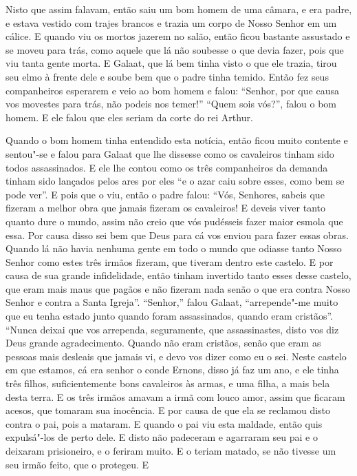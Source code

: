 Nisto que assim falavam, então saiu um bom homem de uma câmara, e era padre, e
estava vestido com trajes brancos e trazia um corpo de Nosso Senhor em um
cálice. E quando viu os mortos jazerem no salão, então ficou bastante assustado
e se moveu para trás, como aquele que lá não soubesse o que devia fazer, pois
que viu tanta gente morta. E Galaat, que lá bem tinha visto o que ele trazia,
tirou seu elmo à frente dele e soube bem que o padre tinha temido. Então fez
seus companheiros esperarem e veio ao bom homem e falou: “Senhor, por que causa
vos movestes para trás, não podeis nos temer!” “Quem sois vós?”, falou o bom
homem. E ele falou que eles seriam da corte do rei Arthur.  

Quando o bom homem tinha entendido esta notícia, então ficou muito contente e
sentou"-se e falou para Galaat que lhe dissesse como os cavaleiros tinham sido
todos assassinados. E ele lhe contou como os três companheiros da demanda
tinham sido lançados pelos ares por eles “e o azar caiu sobre esses, como bem
se pode ver”. E pois que o viu, então o padre falou: “Vós, Senhores, sabeis que
fizeram a melhor obra que jamais fizeram os cavaleiros! E deveis viver tanto
quanto dure o mundo, assim não creio que vós pudésseis fazer maior esmola que
essa. Por causa disso sei bem que Deus para cá vos enviou para fazer essas
obras. Quando lá não havia nenhuma gente em todo o mundo que odiasse tanto
Nosso Senhor como estes três irmãos fizeram, que tiveram dentro este castelo. E
por causa de sua grande infidelidade, então tinham invertido tanto esses desse
castelo, que eram mais maus que pagãos e não fizeram nada senão o que era
contra Nosso Senhor e contra a Santa Igreja”. “Senhor,” falou Galaat,
“arrepende"-me muito que eu tenha estado junto quando foram assassinados, quando
eram cristãos”. “Nunca deixai que vos arrependa, seguramente, que
assassinastes, disto vos diz Deus grande agradecimento. Quando não eram
cristãos, senão que eram as pessoas mais desleais que jamais vi, e devo vos
dizer como eu o sei. Neste castelo em que estamos, cá era senhor o conde
Ernons, disso já faz um ano, e ele tinha três filhos, suficientemente bons
cavaleiros às armas, e uma filha, a mais bela desta terra. E os três irmãos
amavam a irmã com louco amor, assim que ficaram acesos, que tomaram sua
inocência. E por causa de que ela se reclamou disto contra o pai, pois a
mataram. E quando o pai viu esta maldade, então quis expulsá"-los de perto dele.
E disto não padeceram e agarraram seu pai e o deixaram prisioneiro, e o feriram
muito. E o teriam matado, se não tivesse um seu irmão feito, que o protegeu. E
